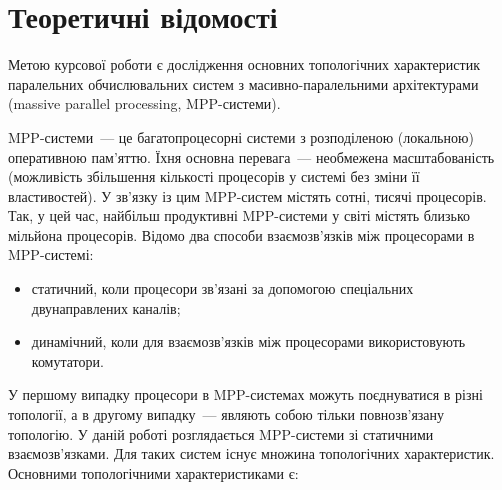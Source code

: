 \documentclass[
	a4paper,
	oneside,
	BCOR = 10mm,
	DIV = 12,
	12pt,
	headings = normal,
]{scrartcl}
\begin{document}
	\section{Теоретичні відомості}
		Метою курсової роботи є дослідження основних топологічних характеристик паралельних обчислювальних систем з масивно-паралельними архітектурами (\textenglish{massive parallel processing}, \textenglish{MPP}-системи).

		\textenglish{MPP}-системи~— це багатопроцесорні системи з розподіленою (локальною) оперативною пам'яттю. Їхня основна перевага~— необмежена масштабованість (можливість збільшення кількості процесорів у системі без зміни її властивостей). У зв'язку із цим \textenglish{MPP}-систем містять сотні, тисячі процесорів. Так, у цей час, найбільш продуктивні \textenglish{MPP}-системи у світі містять близько мільйона процесорів. Відомо два способи взаємозв'язків між процесорами в \textenglish{MPP}-системі:
		\begin{itemize}
			\item статичний, коли процесори зв'язані за допомогою спеціальних двунаправлених каналів;
			\item динамічний, коли для взаємозв'язків між процесорами використовують комутатори.
		\end{itemize}
		У першому випадку процесори в \textenglish{MPP}-системах можуть поєднуватися в різні топології, а в другому випадку~— являють собою тільки повнозв’язану топологію.
		У даній роботі розглядається \textenglish{MPP}-системи зі статичними взаємозв'язками. Для таких систем існує множина топологічних характеристик. Основними топологічними характеристиками є: 
\end{document}
